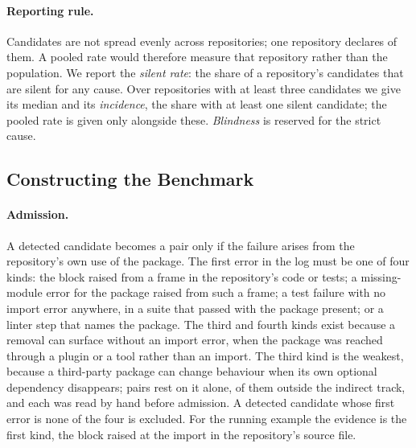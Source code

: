 \documentclass[11pt]{article}
\begin{document}
\paragraph{Reporting rule.}
Candidates are not spread evenly across repositories; one repository declares \nSwirlCand{} of them.
A pooled rate would therefore measure that repository rather than the population.
We report the \emph{silent rate}: the share of a repository's candidates that are silent for any cause.
Over repositories with at least three candidates we give its median and its \emph{incidence}, the share with at least one silent candidate; the pooled rate is given only alongside these.
\emph{Blindness} is reserved for the strict cause.

\subsection{Constructing the Benchmark}
\label{sec:construction}

\paragraph{Admission.}
A detected candidate becomes a pair only if the failure arises from the repository's own use of the package.
The first error in the log must be one of four kinds: the block raised from a frame in the repository's code or tests; a missing-module error for the package raised from such a frame; a test failure with no import error anywhere, in a suite that passed with the package present; or a linter step that names the package.
The third and fourth kinds exist because a removal can surface without an import error, when the package was reached through a plugin or a tool rather than an import.
The third kind is the weakest, because a third-party package can change behaviour when its own optional dependency disappears; \nStepOnly{} pairs rest on it alone, \nStepOnlyDirect{} of them outside the indirect track, and each was read by hand before admission. %
A detected candidate whose first error is none of the four is excluded.
For the running example the evidence is the first kind, the block raised at the import in the repository's source file.
\end{document}
